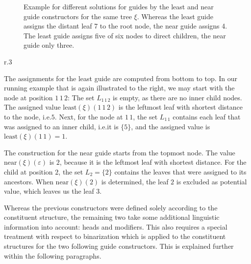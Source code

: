 \documentclass[../../document.tex]{subfiles}
\begin{document}
    \begin{figure}
        \null\hfill
        \begin{minipage}{.35\linewidth}
            \centering
            
        \end{minipage}
        \hfill
        \begin{minipage}{.35\linewidth}
            \centering
            
        \end{minipage}
        \hfill\null
        \caption{\label{fig:guides:diff}
            Example for different solutions for guides by the least and near guide constructors for the same tree \(\xi\).
            Whereas the least guide assigns the distant leaf 7 to the root node, the near guide assigns 4.
            The least guide assigns five of six nodes to direct children, the near guide only three.
        }
    \end{figure}

    \needspace{3cm}
    \begin{wrapfigure}[6]{r}{.3\linewidth}
        \centering
        
    \end{wrapfigure}
    The assignments for the least guide are computed from bottom to top.
    In our running example that is again illustrated to the right, we may start with the node at position \(1\,1\,2\): The set \(L_{1\,1\,2}\) is empty, as there are no inner child nodes. The assigned value \(\mathrm{least}(\xi)(1\,1\,2)\) is the leftmost leaf with shortest distance to the node, i.e.\@ \(5\).
    Next, for the node at \(1\,1\), the set \(L_{1\,1}\) contains each leaf that was assigned to an inner child, i.e.\@ it is \(\{5\}\), and the assigned value is \(\mathrm{least}(\xi)(1\,1) = 1\).

    The construction for the near guide starts from the topmost node.
    The value \(\mathrm{near}(\xi)(\varepsilon)\) is \(2\), because it is the leftmost leaf with shortest distance.
    For the child at position \(2\), the set \(L_{2} = \{2\}\) contains the leaves that were assigned to its ancestors.
    When \(\mathrm{near}(\xi)(2)\) is determined, the leaf \(2\) is excluded as potential value, which leaves us the leaf \(3\).

    \bigskip

    Whereas the previous constructors were defined solely according to the constituent structure, the remaining two take some additional linguistic information into account: heads and modifiers.
    This also requires a special treatment with respect to binarization which is applied to the constituent structures for the two following guide constructors.
    This is explained further within the following paragraphs.
\end{document}
